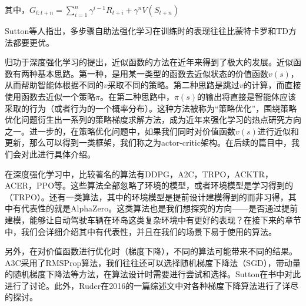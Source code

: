 \documentclass[degree=bachelor, tocarialchapter, pifootnote]{thuthesis}
\begin{document}
      \par 其中，$G_{t:t+n} = \sum_{i = 1}^{n}\gamma^{i-1}R_{t+i} + \gamma^n V(S_{t+n})$
      \par Sutton等人指出，多步骤自助法强化学习在训练时的表现往往比蒙特卡罗和TD方法都要更优\cite{Sutton_book}。
      \par 归功于深度强化学习的提出\cite{atari_2013}\cite{deepRL_overview}，近似函数的方法在近年来得到了极大的发展。近似函数有两种基本思路。第一种，是用某一类型的函数去近似状态的价值函数$v(s)$，从而帮助智能体根据不同的$v$采取不同的策略。第二种思路是跳过$v$的计算，而直接使用函数去近似一个策略$\pi$。在第二种思路中，$\pi(s)$的输出将直接是智能体应该采取的行为（或者行为的一个概率分布）。这种方法被称为``策略优化''，围绕策略优化问题衍生出一系列的策略梯度求解方法，成为近年来强化学习的热点研究方向之一。进一步的，在策略优化问题中，如果我们同时对价值函数$v(s)$进行近似和更新，那么可以得到一类框架，我们称之为actor-critic架构\cite{Sutton_book}。在后续的篇目中，我们会对此进行具体介绍。\par
      在深度强化学习中，比较著名的算法有DDPG\cite{DDPG}，A2C\cite{A3C}，TRPO\cite{TRPO}，ACKTR\cite{ACKTR}，ACER\cite{ACER}，PPO\cite{PPO}等。这些算法全部忽略了环境的模型，或者环境模型是学习得到的（TRPO）。还有一类算法，其中的环境模型是提前设计建模得到的而非习得，其中有代表性的就是AlphaZero\cite{AlphaZero}。这类算法也是我们想探究的方向——是否通过提前建模，能够让自动驾驶车辆在环岛这类复杂环境中有更好的表现？在接下来的章节中，我们会详细介绍其中有代表性，并且在我们的场景下易于使用的算法。\par
      另外，在对价值函数进行优化时（梯度下降），不同的算法可能带来不同的结果。A3C采用了RMSProp算法\cite{RMSProp}，我们往往还可以选择随机梯度下降法（SGD），带动量的随机梯度下降法\cite{SGD_momentum}等方法，在算法设计时需要进行尝试和选择。Sutton在书中对此进行了讨论\cite{Sutton_book}。此外，Ruder在2016的一篇综述文中对各种梯度下降算法进行了详尽的探讨\cite{GD_overview}。

      
\end{document}
